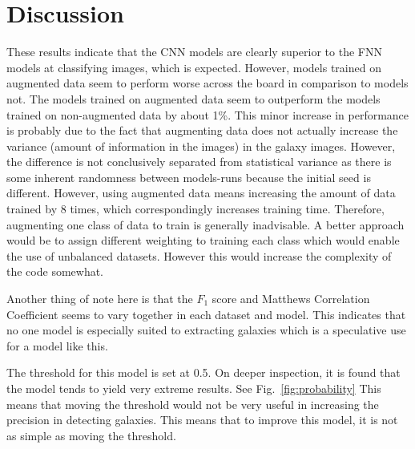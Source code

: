 \documentclass[a4paper,fleqn,usenatbib]{mnras}
\begin{document}
\section{Discussion}
These results indicate that the CNN models are clearly superior to the FNN models at classifying images, which is expected. However, models trained on augmented data seem to perform worse across the board in comparison to models not. The models trained on augmented data seem to outperform the models trained on non-augmented data by about 1\%. This minor increase in performance is probably due to the fact that augmenting data does not actually increase the variance (amount of information in the images) in the galaxy images. However, the difference is not conclusively separated from statistical variance as there is some inherent randomness between models-runs because the initial seed is different. However, using augmented data means increasing the amount of data trained by 8 times, which correspondingly increases training time. Therefore, augmenting one class of data to train is generally inadvisable. A better approach would be to assign different weighting to training each class which would enable the use of unbalanced datasets. However this would increase the complexity of the code somewhat. 



Another thing of note here is that the $F_1$ score and Matthews Correlation Coefficient seems to vary together in each dataset and model. This indicates that no one model is especially suited to extracting galaxies which is a speculative use for a model like this. 

The threshold for this model is set at 0.5. On deeper inspection, it is found that the model tends to yield very extreme results. See Fig.~\ref{fig:probability} This means that moving the threshold would not be very useful in increasing the precision in detecting galaxies. This means that to improve this model, it is not as simple as moving the threshold. 
\end{document}
